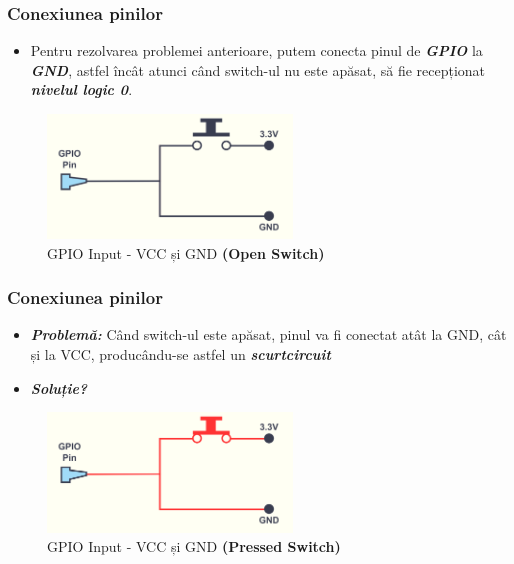 \documentclass[xcolor={table}]{beamer}
\begin{document}
	\begin{frame}
	    \frametitle{Conexiunea pinilor}
	    \begin{itemize}
	        \item Pentru rezolvarea problemei anterioare, putem conecta pinul de \textbf{\textit{GPIO}} la \textbf{\textit{GND}}, astfel încât atunci când switch-ul nu este apăsat, să fie recepționat \textbf{\textit{nivelul logic 0}}.
	    \end{itemize}
	    \begin{figure}
	        \centering
	        \includegraphics[width=6.5cm]{images/gpio2-vccandgnd-open.png}
	        \caption{GPIO Input - VCC și GND \textbf{(Open Switch)}}
	        \label{fig:my_label}
	    \end{figure}
	\end{frame}
		\begin{frame}
	    \frametitle{Conexiunea pinilor}
	    \begin{itemize}
	        \item \textbf{\textit{\color{red}Problemă: }} Când switch-ul este apăsat, pinul va fi conectat atât la GND, cât și la VCC, producându-se astfel un \textbf{\textit{scurtcircuit}}
	        \item \textbf{\textit{Soluție?}}
	    \end{itemize}
	    \begin{figure}
	        \centering
	        \includegraphics[width=6.5cm]{images/gpio2-vccandgnd-pressed.png}
	        \caption{GPIO Input - VCC și GND \textbf{(Pressed Switch)}}
	        \label{fig:my_label}
	    \end{figure}
	\end{frame}
\end{document}
